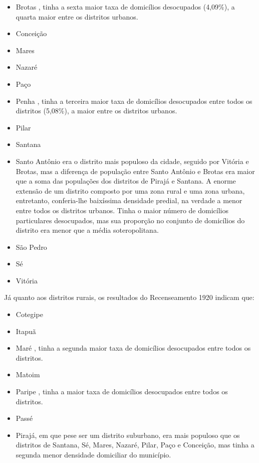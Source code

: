 \begin{itemize}
 \item Brotas , tinha a sexta maior taxa de domicílios desocupados (4,09\%), a quarta maior entre os distritos urbanos.
 \item Conceição 	
 \item Mares
 \item Nazaré
 \item Paço
 \item Penha , tinha a terceira maior taxa de domicílios desocupados entre todos os distritos (5,08\%), a maior entre os distritos urbanos.
 \item Pilar
 \item Santana
 \item Santo Antônio era o distrito mais populoso da cidade, seguido por Vitória e Brotas, mas a diferença de população entre Santo Antônio e Brotas era maior que a soma das populações dos distritos de Pirajá e Santana. A enorme extensão de um distrito composto por uma zona rural e uma zona urbana, entretanto, conferia-lhe baixíssima densidade predial, na verdade a menor entre todos os distritos urbanos. Tinha o maior número de domicílios particulares desocupados, mas sua proporção no conjunto de domicílios do distrito era menor que a média soteropolitana.
 \item São Pedro
 \item Sé
 \item Vitória
\end{itemize} 	

Já quanto aos distritos rurais, os resultados do Recenseamento 1920 indicam que:
 
\begin{itemize}
 \item Cotegipe
 \item Itapuã
 \item Maré , tinha a segunda maior taxa de domicílios desocupados entre todos os distritos.
 \item Matoim
 \item Paripe , tinha a maior taxa de domicílios desocupados entre todos os distritos.
 \item Passé
 \item Pirajá, em que pese ser um distrito suburbano, era mais populoso que os distritos de Santana, Sé, Mares, Nazaré, Pilar, Paço e Conceição, mas tinha a segunda menor densidade domiciliar do município.
\end{itemize}




